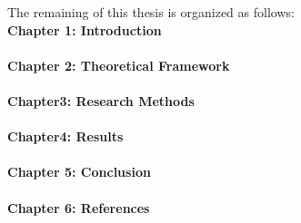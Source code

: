 \lipsum[2-4]
The remaining of this thesis is organized as follows:\\

\textbf{Chapter 1: Introduction} \\  
\lipsum[1]
 \\

\textbf{Chapter 2: Theoretical Framework }\\
\lipsum[2]
\\

\textbf{Chapter3: Research Methods} \\
\lipsum[2]\\

\textbf{Chapter4: Results} \\
\lipsum[2]\\

\textbf{Chapter 5: Conclusion} \\
\lipsum[2]\\

\textbf{Chapter 6: References} \\
\lipsum[2]
